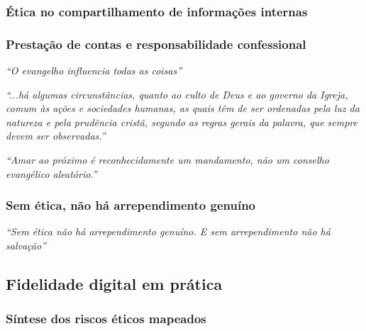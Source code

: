 \subsubsection{Ética no compartilhamento de informações internas}

\subsubsection{Prestação de contas e responsabilidade confessional}

\textit{“O evangelho influencia todas as coisas”} \cite[p. 56]{keller2014}

\textit{“...há algumas circunstâncias, quanto ao culto de Deus e ao governo da Igreja, comum às ações e sociedades humanas, as quais têm de ser ordenadas pela luz da natureza e pela prudência cristã, segundo as regras gerais da palavra, que sempre devem ser observadas.”} \cite[Cap. I, § VI]{cfw}

\textit{“Amar ao próximo é reconhecidamente um mandamento, não um conselho evangélico aleatório.”} \cite[p. 745]{calvino2022}

\subsubsection{Sem ética, não há arrependimento genuíno}

\textit{“Sem ética não há arrependimento genuíno. E sem arrependimento não há salvação”} \cite[p. 102]{stott2008}

\subsection{Fidelidade digital em prática}

\subsubsection{Síntese dos riscos éticos mapeados}
